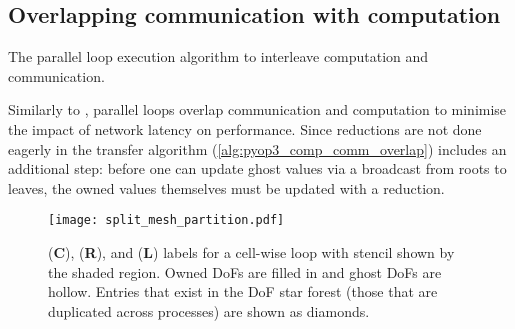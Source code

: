 \documentclass[thesis]{subfiles}
\begin{document}
\subsection{Overlapping communication with computation}
\label{sec:parallel_overlap_computation_communication}

\begin{algorithm}
  \caption{The  parallel loop execution algorithm to interleave computation and communication.}
  \begin{algorithmic}[1]
    \State {} 

     
      \State {}
    \EndFor

    \State {} 
    \State {} 

     
      \State {}
    \EndFor

    \State {} 

     
      \State {}
    \EndFor
  \end{algorithmic}
  \label{alg:pyop3_comp_comm_overlap}
\end{algorithm}

Similarly to ,  parallel loops overlap communication and computation to minimise the impact of network latency on performance.
Since reductions are not done eagerly in  the transfer algorithm (\cref{alg:pyop3_comp_comm_overlap}) includes an additional step: before one can update ghost values via a broadcast from roots to leaves, the owned values themselves must be updated with a reduction.

\begin{figure}
  \centering
  \texttt{[image: split\_mesh\_partition.pdf]}
  \caption{
    \coreiter (\textbf{C}), \rootiter (\textbf{R}), and \leafiter (\textbf{L}) labels for a cell-wise loop with stencil shown by the shaded region.
    Owned DoFs are filled in and ghost DoFs are hollow.
    Entries that exist in the DoF star forest (those that are duplicated across processes) are shown as diamonds.
  }
  \label{fig:split_mesh_partition}
\end{figure}
\end{document}
